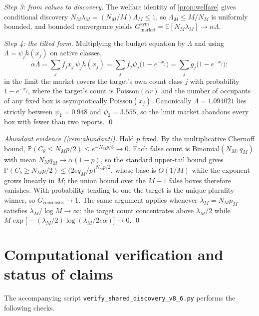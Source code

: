\documentclass[11pt]{article}
\theoremstyle{definition}
\theoremstyle{remark}
\newcommand{\E}{\mathbb{E}}
\newcommand{\Prob}{\mathbb{P}}
\newcommand{\1}{\mathbf{1}}
\newcommand{\cons}{\mathrm{consensus}}
\newcommand{\mkt}{\mathrm{market}}
\begin{document}
\emph{Step 3: from values to discovery.} The welfare identity of \cref{prop:welfare} gives conditional discovery $N_M\lambda_M=(N_M/M)\Lambda_M\le1$, so $\Lambda_M\le M/N_M$ is uniformly bounded, and bounded convergence yields $G_{\mkt}^{\mathrm{sym}}=\E[N_M\lambda_M]\to\alpha\Lambda$.

\emph{Step 4: the tilted form.} Multiplying the budget equation by $\Lambda$ and using $\Lambda=\psi_jh(x_j)$ on active classes,
\[
\alpha\Lambda
=\sum_j f_jx_j\,\psi_jh(x_j)
=\sum_j f_j\psi_j\bigl(1-e^{-x_j}\bigr)
=\sum_j g_j\bigl(1-e^{-x_j}\bigr):
\]
in the limit the market covers the target's own count class $j$ with probability $1-e^{-x_j}$, where the target's count is $\mathrm{Poisson}(\alpha r)$ and the number of occupants of any fixed box is asymptotically $\mathrm{Poisson}(x_j)$. Canonically $\Lambda=1.094021$ lies strictly between $\psi_1=0.948$ and $\psi_2=3.555$, so the limit market abandons every box with fewer than two reports. \qed

\emph{Abundant evidence (\cref{rem:abundant}).} Hold $p$ fixed. By the multiplicative Chernoff bound, $\Prob(C_\theta\le N_Mp/2)\le e^{-N_Mp/8}\to0$. Each false count is $\mathrm{Binomial}(N_M,q_M)$ with mean $N_Mq_M\to\alpha(1-p)$, so the standard upper-tail bound gives $\Prob(C_b\ge N_Mp/2)\le\bigl(2eq_M/p\bigr)^{N_Mp/2}$, whose base is $O(1/M)$ while the exponent grows linearly in $M$; the union bound over the $M-1$ false boxes therefore vanishes. With probability tending to one the target is the unique plurality winner, so $G_{\cons}\to1$. The same argument applies whenever $\lambda_M=N_Mp_M$ satisfies $\lambda_M/\log M\to\infty$: the target count concentrates above $\lambda_M/2$ while $M\exp\bigl[-(\lambda_M/2)\log(\lambda_M/2e\alpha)\bigr]\to0$. \qed

\section{Computational verification and status of claims}
\label{app:computation}

The accompanying script \texttt{verify\_shared\_discovery\_v8\_6.py} performs the following checks.
\end{document}
